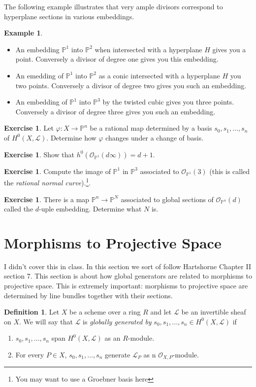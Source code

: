 \documentclass[12pt]{article}
\numberwithin{equation}{section}
\theoremstyle{definition}
\newtheorem{definition}[theorem]{Definition}
\newtheorem{example}[theorem]{Example}
\newtheorem{exercise}[theorem]{Exercise}
\theoremstyle{remark}
\newcommand{\Ocal}{\mathcal{O}}
\newcommand{\PP}{\mathbb{P}}
\newcommand{\Lcal}{\mathcal{L}}
\begin{document}
The following example illustrates that very ample divisors correspond to hyperplane sections in various embeddings. 
\begin{example}
	\begin{itemize}
		\item An embedding $\PP^1$ into $\PP^2$ when intersected with a hyperplane $H$ gives you a point. Conversely a divisor of degree one gives you this embedding. 
		\item An emedding of $\PP^1$ into $\PP^2$ as a conic intersected with a hyperplane $H$ you two points. Conversely a divisor of degree two gives you such an embedding. 
		\item An embedding of $\PP^1$ into $\PP^3$ by the twisted cubic gives you three points. Conversely a divisor of degree three gives you such an embedding.
	\end{itemize}
\end{example}

\begin{exercise}
	Let $\varphi: X \to \PP^n$ be a rational map determined by a basis $s_0,s_1,\ldots,s_n$ of $H^0(X,\Lcal)$. 
	Determine how $\varphi$ changes under a change of basis.
\end{exercise}

\begin{exercise}
	Show that $h^0( \Ocal_{\PP^1}(d\infty)) = d+1$.
\end{exercise}

\begin{exercise}
	Compute the image of $\PP^1$ in $\PP^3$ associated to $\Ocal_{\PP^1}(3)$ (this is called the \emph{rational normal curve}).\footnote{You may want to use a Groebner basis here}.
\end{exercise}

\begin{exercise}
	There is a map $\PP^n \to \PP^N$ associated to global sections of $\Ocal_{\PP^n}(d)$ called the $d$-uple embedding. 
	Determine what $N$ is. 
\end{exercise}


\section{Morphisms to Projective Space}\label{sec:maps-to-projective-space}
I didn't cover this in class.
In this section we sort of follow Hartshorne Chapter II section 7.
This section is about how global generators are related to morphisms to projective space. 
This is extremely important: morphisms to projective space are determined by line bundles together with their sections. 
\begin{definition}
	Let $X$ be a scheme over a ring $R$ and let $\Lcal$ be an invertible sheaf on $X$. 
	We will say that $\Lcal$ is \emph{globally generated by} $s_0,s_1,\ldots,s_n \in H^0(X,\Lcal)$ if  
	\begin{enumerate}
		\item $s_0,s_1,\ldots,s_n$ span $H^0(X,\Lcal)$ as an $R$-module. 
		\item For every $P \in X$, $s_0,s_1,\ldots,s_n$ generate $\Lcal_P$ as n $\Ocal_{X,P}$-module. 
	\end{enumerate}
\end{definition}
\end{document}
